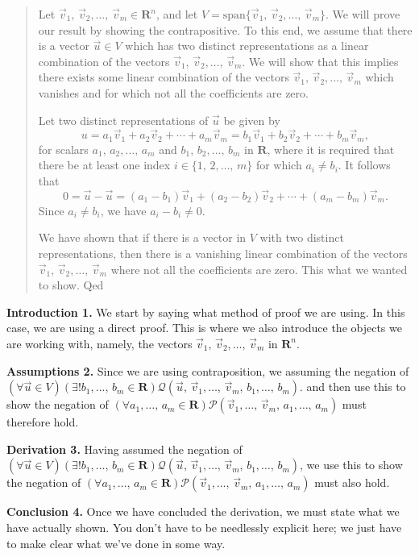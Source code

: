 \documentclass[a4paper,11pt]{article}
\newcommand{\R}{\mathbf{R}}
\newcommand{\PP}{\mathscr{P}}
\newcommand{\QQ}{\mathscr{Q}}
\begin{document}
\begin{quotation}
  Let $\vec v_1,\,\vec v_2,\dots,\,\vec v_m \in \R^n$, and let
  $V=\text{span}\{\vec v_1,\,\vec v_2,\dots,\,\vec v_m\}$. We will prove our
  result by showing the contrapositive. To this end, we assume that there is a
  vector $\vec u \in V$ which has two distinct representations as a linear
  combination of the vectors $\vec v_1,\,\vec v_2,\dots,\,\vec v_m$. We will
  show that this implies there exists some linear combination of the vectors
  $\vec v_1,\,\vec v_2,\dots,\,\vec v_m$ which vanishes and for which not all
  the coefficients are zero.

  Let two distinct representations of $\vec u$ be given by
  \[
    u = a_1\vec v_1 + a_2\vec v_2 + \cdots + a_m\vec v_m =
    b_1\vec v_1 + b_2\vec v_2 + \cdots + b_m\vec v_m,
  \]
  for scalars $a_1,\,a_2,\dots,\,a_m$ and $b_1,\,b_2,\dots,\,b_m$ in $\R$, where
  it is required that there be at least one index $i \in \{1,\,2,\dots,\,m\}$
  for which $a_i \neq b_i$. It follows that
  \[
    0 = \vec u-\vec u =
    (a_1-b_1)\vec v_1 + (a_2-b_2)\vec v_2 + \cdots + (a_m-b_m)\vec v_m.
  \]
  Since $a_i \neq b_i$, we have $a_i - b_i \neq 0$.

  We have shown that if there is a vector in $V$ with two distinct
  representations, then there is a vanishing linear combination of the vectors
  $\vec v_1,\,\vec v_2,\dots,\,\vec v_m$ where not all the coefficients are
  zero. This what we wanted to show.
  \hfill{\sc Qed}
\end{quotation}

{\bf Introduction 1.} We start by saying what method of proof we are using. In
this case, we are using a direct proof. This is where we also introduce the
objects we are working with, namely, the vectors $\vec v_1,\,\vec
v_2,\dots,\,\vec v_m$ in $\R^n$.

{\bf Assumptions 2.} Since we are using contraposition, we assuming the negation
of $(\forall\vec u \in V)(\exists!b_1,\dots,\,b_m \in \R)\QQ(\vec u,\,\vec
v_1,\dots,\,\vec v_m,\,b_1,\dots,\,b_m)$. and then use this to show the negation
of $(\forall a_1,\dots,\,a_m \in \R)\PP(\vec v_1,\dots,\,\vec
v_m,\,a_1,\dots,\,a_m)$ must therefore hold.

{\bf Derivation 3.} Having assumed the negation of $(\forall\vec u \in
V)(\exists!b_1,\dots,\,b_m \in \R)\QQ(\vec u,\,\vec v_1,\dots,\,\vec
v_m,\,b_1,\dots,\,b_m)$, we use this to show the negation of $(\forall
a_1,\dots,\,a_m \in \R)\PP(\vec v_1,\dots,\,\vec v_m,\,a_1,\dots,\,a_m)$ must
also hold.

{\bf Conclusion 4.} Once we have concluded the derivation, we must state what we
have actually shown. You don't have to be needlessly explicit here; we just have
to make clear what we've done in some way.
\end{document}
